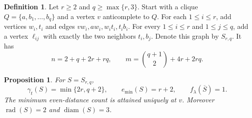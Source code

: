 \documentclass[11pt,a4paper]{article}
\newtheorem{proposition}[theorem]{Proposition}
\theoremstyle{definition}\newtheorem{definition}[theorem]{Definition}
\theoremstyle{remark}\newtheorem{remark}[theorem]{Remark}
\newcommand{\rad}{\operatorname{rad}}
\newcommand{\diam}{\operatorname{diam}}
\begin{document}
\begin{definition}
\label{early:def:302-family}
Let $r\geq2$ and $q\geq\max\{r,3\}$.  Start with a clique
$Q=\{a,b_1,\ldots,b_q\}$ and a vertex $v$ anticomplete to $Q$.
For each $1\leq i\leq r$, add vertices $w_i,t_i$ and edges
$vw_i,aw_i,w_it_i,t_ib_i$.  For every $1\leq i\leq r$ and
$1\leq j\leq q$, add a vertex $\ell_{ij}$ with exactly the two
neighbors $t_i,b_j$.  Denote this graph by $S_{r,q}$.  It has
\[
 n=2+q+2r+rq,\qquad m=\binom{q+1}{2}+4r+2rq.
\]
\end{definition}

\begin{proposition}
\label{early:prop:302-invariants}
For $S=S_{r,q}$,
\[
 \gamma_t(S)=\min\{2r,q+2\},\qquad
 e_{\min}(S)=r+2,\qquad f_\lambda(\overline S)=1.
\]
The minimum even-distance count is attained uniquely at $v$.
Moreover $\rad(S)=2$ and $\diam(S)=3$.
\end{proposition}
\end{document}
